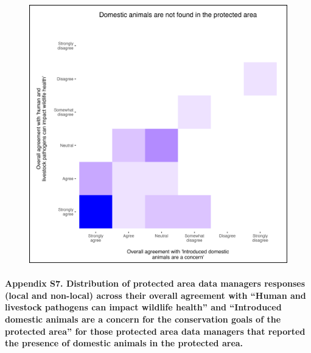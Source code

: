 \documentclass[
  letterpaper,
  DIV=11,
  numbers=noendperiod]{scrartcl}
\let\oldparagraph\paragraph
\renewcommand{\paragraph}[1]{\oldparagraph{#1}\mbox{}}
\begin{document}
\begin{figure}[H]

{\centering \includegraphics[width=5.20833in,height=\textheight]{plots/appedix_plot_5.png}

}

\end{figure}

\newpage

\hypertarget{appendix-s7.-distribution-of-protected-area-data-managers-responses-local-and-non-local-across-their-overall-agreement-with-human-and-livestock-pathogens-can-impact-wildlife-health-and-introduced-domestic-animals-are-a-concern-for-the-conservation-goals-of-the-protected-area-for-those-protected-area-data-managers-that-reported-the-presence-of-domestic-animals-in-the-protected-area.}{%
\paragraph{Appendix S7. Distribution of protected area data managers
responses (local and non-local) across their overall agreement with
``Human and livestock pathogens can impact wildlife health'' and
``Introduced domestic animals are a concern for the conservation goals
of the protected area'' for those protected area data managers that
reported the presence of domestic animals in the protected
area.}\label{appendix-s7.-distribution-of-protected-area-data-managers-responses-local-and-non-local-across-their-overall-agreement-with-human-and-livestock-pathogens-can-impact-wildlife-health-and-introduced-domestic-animals-are-a-concern-for-the-conservation-goals-of-the-protected-area-for-those-protected-area-data-managers-that-reported-the-presence-of-domestic-animals-in-the-protected-area.}}
\end{document}
